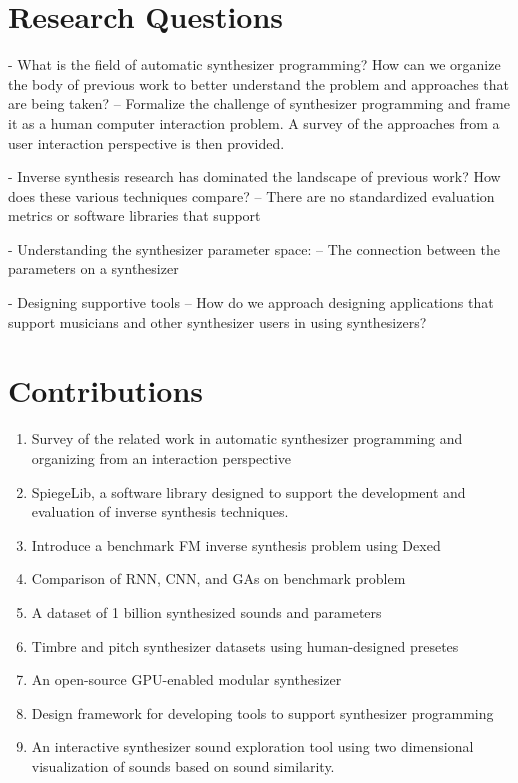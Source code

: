 \section{Research Questions}
- What is the field of automatic synthesizer programming? How can we organize the body of previous work to better understand the problem and approaches that are being taken?
-- Formalize the challenge of synthesizer programming and frame it as a human computer interaction problem. A survey of the approaches from a user interaction perspective is then provided.

- Inverse synthesis research has dominated the landscape of previous work? How does these various techniques compare?
-- There are no standardized evaluation metrics or software libraries that support 

- Understanding the synthesizer parameter space:
-- The connection between the parameters on a synthesizer 

- Designing supportive tools
-- How do we approach designing applications that support musicians and other synthesizer users in using synthesizers?

\section{Contributions}
\begin{enumerate}
    \item Survey of the related work in automatic synthesizer programming and organizing from an interaction perspective
    \item SpiegeLib, a software library designed to support the development and evaluation of inverse synthesis techniques.
    \item Introduce a benchmark FM inverse synthesis problem using Dexed
    \item Comparison of RNN, CNN, and GAs on benchmark problem
    \item A dataset of 1 billion synthesized sounds and parameters
    \item Timbre and pitch synthesizer datasets using human-designed presetes
    \item An open-source GPU-enabled modular synthesizer
    \item Design framework for developing tools to support synthesizer programming
    \item An interactive synthesizer sound exploration tool using two dimensional visualization of sounds based on sound similarity.
\end{enumerate}

